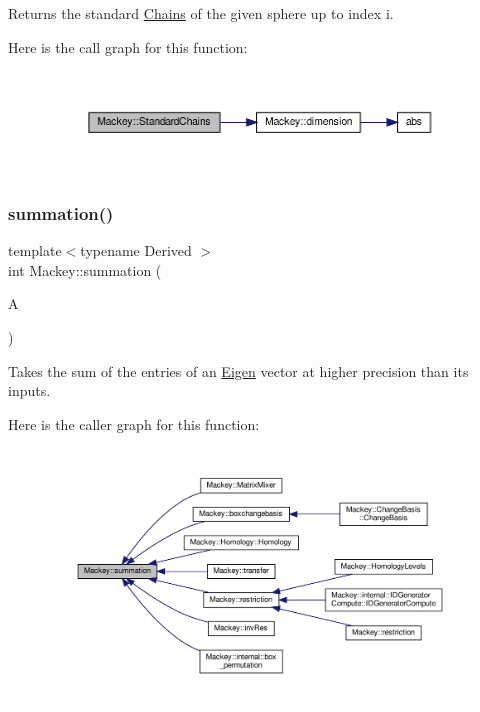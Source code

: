 Returns the standard \hyperlink{classMackey_1_1Chains}{Chains} of the given sphere up to index i. 

Here is the call graph for this function\+:\nopagebreak
\begin{figure}[H]
\begin{center}
\leavevmode
\includegraphics[width=350pt]{namespaceMackey_aac9deeccbe291d1dd17df46a3d7c1f2b_cgraph}
\end{center}
\end{figure}
\mbox{\label{namespaceMackey_a359aa27a035d2b1f1a3f2f8270fc9e52}} 
\subsubsection{\texorpdfstring{summation()}{summation()}}
{\footnotesize\ttfamily template$<$typename Derived $>$ \\
int Mackey\+::summation (\begin{DoxyParamCaption}\item[{const Eigen\+::\+Matrix\+Base$<$ Derived $>$ \&}]{A }\end{DoxyParamCaption})}



Takes the sum of the entries of an \hyperlink{namespaceEigen}{Eigen} vector at higher precision than its inputs. 

Here is the caller graph for this function\+:\nopagebreak
\begin{figure}[H]
\begin{center}
\leavevmode
\includegraphics[width=350pt]{namespaceMackey_a359aa27a035d2b1f1a3f2f8270fc9e52_icgraph}
\end{center}
\end{figure}
\mbox{\label{namespaceMackey_aabed38680919594c4ba5eaa6730a7f82}} 
